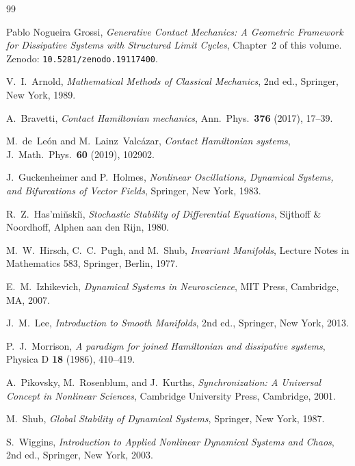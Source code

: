 \documentclass[12pt, oneside]{book}
\theoremstyle{plain}
\theoremstyle{definition}
\theoremstyle{remark}
\begin{document}
\begin{thebibliography}{99}

Pablo Nogueira Grossi,
\emph{Generative Contact Mechanics: A Geometric Framework for
Dissipative Systems with Structured Limit Cycles},
Chapter~2 of this volume. Zenodo: \texttt{10.5281/zenodo.19117400}.

V.~I.~Arnold,
\emph{Mathematical Methods of Classical Mechanics},
2nd ed., Springer, New York, 1989.

A.~Bravetti,
\emph{Contact Hamiltonian mechanics},
Ann.\ Phys.\ \textbf{376} (2017), 17--39.

M.~de~Le{\'o}n and M.~Lainz~Valc{\'a}zar,
\emph{Contact Hamiltonian systems},
J.\ Math.\ Phys.\ \textbf{60} (2019), 102902.

J.~Guckenheimer and P.~Holmes,
\emph{Nonlinear Oscillations, Dynamical Systems, and Bifurcations
of Vector Fields},
Springer, New York, 1983.

R.~Z.~Has{'}mi{\u{n}}ski{\u{\i}},
\emph{Stochastic Stability of Differential Equations},
Sijthoff \& Noordhoff, Alphen aan den Rijn, 1980.

M.~W.~Hirsch, C.~C.~Pugh, and M.~Shub,
\emph{Invariant Manifolds},
Lecture Notes in Mathematics 583, Springer, Berlin, 1977.

E.~M.~Izhikevich,
\emph{Dynamical Systems in Neuroscience},
MIT Press, Cambridge, MA, 2007.

J.~M.~Lee,
\emph{Introduction to Smooth Manifolds},
2nd ed., Springer, New York, 2013.

P.~J.~Morrison,
\emph{A paradigm for joined Hamiltonian and dissipative systems},
Physica D \textbf{18} (1986), 410--419.

A.~Pikovsky, M.~Rosenblum, and J.~Kurths,
\emph{Synchronization: A Universal Concept in Nonlinear Sciences},
Cambridge University Press, Cambridge, 2001.

M.~Shub,
\emph{Global Stability of Dynamical Systems},
Springer, New York, 1987.

S.~Wiggins,
\emph{Introduction to Applied Nonlinear Dynamical Systems and Chaos},
2nd ed., Springer, New York, 2003.

\end{thebibliography}
\cleardoublepage
\end{document}
